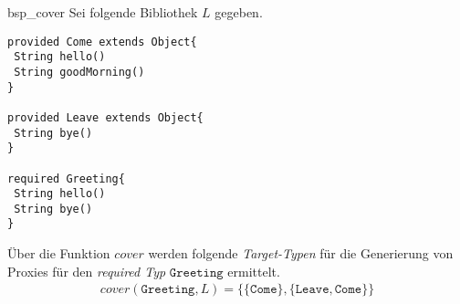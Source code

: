 \begin{example}{bsp_cover}
Sei folgende Bibliothek $L$ gegeben.
\begin{lstlisting}[style = dsl]
provided Come extends Object{
 String hello()
 String goodMorning()
}

provided Leave extends Object{
 String bye()
}

required Greeting{
 String hello()
 String bye()
}
\end{lstlisting}
Über die Funktion $\mathit{cover}$ werden folgende \emph{Target-Typen} für die Generierung von Proxies für den \emph{required Typ} $\texttt{Greeting}$ ermittelt.
\begin{gather*}
\mathit{cover(\texttt{Greeting},L)} = \{
	\{\texttt{Come}\},\{\texttt{Leave}, \texttt{Come}\}
\}
\end{gather*}
\end{example}
\newpage


